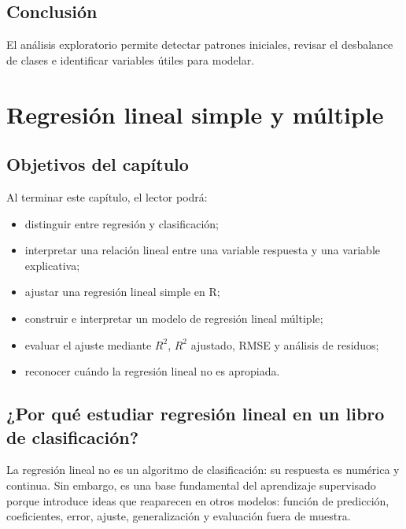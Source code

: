 \documentclass[
  spanish,
  10.5pt,
  letterpaper,
  openany,
  headings=big]{scrbook}
\providecommand{\tightlist}{%
  \setlength{\itemsep}{0pt}\setlength{\parskip}{0pt}}
\begin{document}
\section{Conclusión}\label{conclusiuxf3n-1}

El análisis exploratorio permite detectar patrones iniciales, revisar el
desbalance de clases e identificar variables útiles para modelar.


\chapter{Regresión lineal simple y
múltiple}\label{regresiuxf3n-lineal-simple-y-muxfaltiple}

\section{Objetivos del capítulo}\label{objetivos-del-capuxedtulo-3}

Al terminar este capítulo, el lector podrá:

\begin{itemize}
\tightlist
\item
  distinguir entre regresión y clasificación;
\item
  interpretar una relación lineal entre una variable respuesta y una
  variable explicativa;
\item
  ajustar una regresión lineal simple en R;
\item
  construir e interpretar un modelo de regresión lineal múltiple;
\item
  evaluar el ajuste mediante \(R^2\), \(R^2\) ajustado, RMSE y análisis
  de residuos;
\item
  reconocer cuándo la regresión lineal no es apropiada.
\end{itemize}

\section{¿Por qué estudiar regresión lineal en un libro de
clasificación?}\label{por-quuxe9-estudiar-regresiuxf3n-lineal-en-un-libro-de-clasificaciuxf3n}

La regresión lineal no es un algoritmo de clasificación: su respuesta es
numérica y continua. Sin embargo, es una base fundamental del
aprendizaje supervisado porque introduce ideas que reaparecen en otros
modelos: función de predicción, coeficientes, error, ajuste,
generalización y evaluación fuera de muestra.
\end{document}
